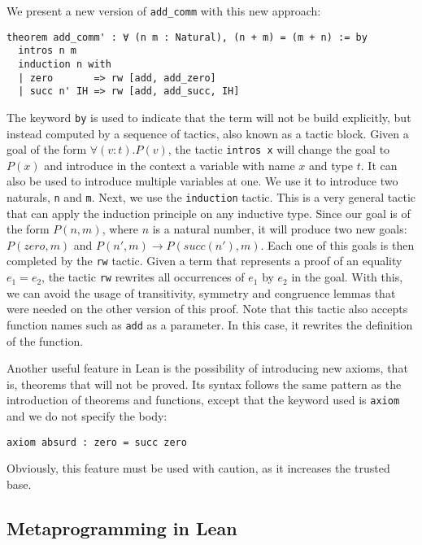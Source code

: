 We present a new version of \texttt{add\_comm} with this new approach:

\begin{verbatim}
theorem add_comm' : ∀ (n m : Natural), (n + m) = (m + n) := by
  intros n m
  induction n with
  | zero       => rw [add, add_zero]
  | succ n' IH => rw [add, add_succ, IH]
\end{verbatim}

The keyword \texttt{by} is used to indicate that the term will not be build explicitly, but instead computed by a sequence of tactics, also known as a tactic block. Given a goal of the form $\forall (v : t) . P(v)$, the tactic \texttt{intros x} will change the goal to $P(x)$ and introduce in the context a variable with name $x$ and type $t$. It can also be used to introduce multiple variables at one. We use it to introduce two naturals, \texttt{n} and \texttt{m}. Next, we use the \texttt{induction} tactic. This is a very general tactic that can apply the induction principle on any inductive type. Since our goal is of the form $P(n, m)$, where $n$ is a natural number, it will produce two new goals: $P(zero, m)$ and $P(n', m) \rightarrow P(succ(n'), m)$. Each one of this goals is then completed by the \texttt{rw} tactic. Given a term that represents a proof of an equality $e_{1} = e_{2}$, the tactic \texttt{rw} rewrites all occurrences of $e_{1}$ by $e_{2}$ in the goal. With this, we can avoid the usage of transitivity, symmetry and congruence lemmas that were needed on the other version of this proof. Note that this tactic also accepts function names such as \texttt{add} as a parameter. In this case, it rewrites the definition of the function.

Another useful feature in Lean is the possibility of introducing new axioms, that is, theorems that will not be proved. Its syntax follows the same pattern as the introduction of theorems and functions, except that the keyword used is \texttt{axiom} and we do not specify the body:

\begin{verbatim}
axiom absurd : zero = succ zero
\end{verbatim}

Obviously, this feature must be used with caution, as it increases the trusted base.

\subsection{Metaprogramming in Lean}

